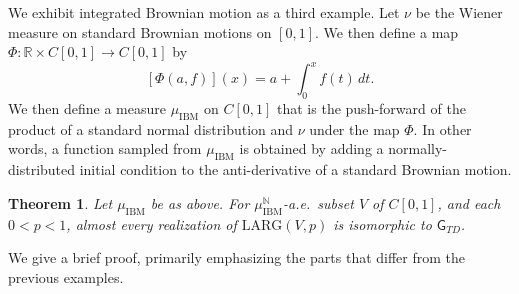 \documentclass{daj}
\newtheorem{thm}{Theorem}
\newcommand{\LARG}{\mathrm{LARG}}
\newcommand{\N}{\mathbb N}
\newcommand{\R}{\mathbb R}
\begin{document}
We exhibit integrated Brownian motion as a third example. Let $\nu$ be the Wiener measure on
standard Brownian motions on $[0,1]$. We then define a map $\Phi\colon \R\times C[0,1]\to C[0,1]$
by
$$
[\Phi(a,f)](x)=a+\int_0^x f(t)\,dt.
$$
We then define a measure $\mu_\text{IBM}$ on $C[0,1]$ that is the push-forward of the product of a
standard normal distribution and $\nu$ under the map $\Phi$. In other words, a function sampled from
$\mu_\text{IBM}$ is obtained by adding a normally-distributed initial condition to the anti-derivative
of a standard Brownian motion.

\begin{thm}
Let $\mu_\text{IBM}$ be as above. For $\mu_\text{IBM}^\N$-a.e.\ subset $V$ of $C[0,1]$,
and each $0<p<1$, almost every realization of $\LARG(V,p)$ is isomorphic to $\mathsf{G}_{TD}$.
\end{thm}

We give a brief proof, primarily emphasizing the parts that differ from the previous examples.
\end{document}

